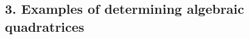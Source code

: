 \documentclass[polutonikogreek,english,twoside,openright]{article}
\newlength{\oldjot}
\begin{document}



\subsection*{3. Examples of determining algebraic quadratrices}
\end{document}
